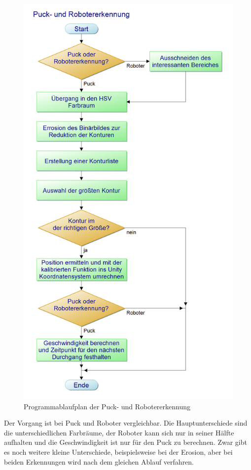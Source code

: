 \begin{figure} [h]
\begin{minipage}[t]{0.45\textwidth}
\includegraphics[scale =0.3]{images/bv_pap}
 \caption{Programmablaufplan der Puck- und Robotererkennung}
 \label{bv_pap}
\end{minipage}
\end{figure}

Der Vorgang ist bei Puck und Roboter vergleichbar. Die Hauptunterschiede sind die unterschiedlichen Farbräume, der Roboter kann sich nur in seiner Hälfte aufhalten und die Geschwindigkeit ist nur für den Puck zu berechnen. Zwar gibt es noch weitere kleine Unterschiede, beispielsweise bei der Erosion, aber bei beiden Erkennungen wird nach dem gleichen Ablauf verfahren.

